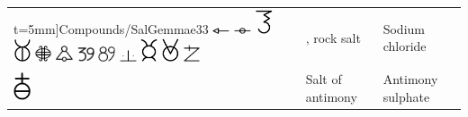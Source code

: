 \documentclass[british,final,landscape]{scrartcl}
\begin{document}
\begin{refsection}
\begin{supertabular}{p{0.3\textwidth}p{0.34\textwidth}p{0.34\textwidth}}
t=5mm]{Compounds/SalGemmae33} \includegraphics[width=5mm]{Compounds/SalGemmae34} \includegraphics[width=5mm]{Compounds/SalGemmae35} \includegraphics[width=5mm]{Compounds/SalGemmae36} \includegraphics[width=5mm]{Compounds/SalGemmae37} \includegraphics[width=5mm]{Compounds/SalGemmae38} \includegraphics[width=5mm]{Compounds/SalGemmae39} \includegraphics[width=5mm]{Compounds/SalGemmae40} \includegraphics[width=5mm]{Compounds/SalGemmae41} \includegraphics[width=5mm]{Compounds/SalGemmae42} \includegraphics[width=5mm]{Compounds/SalGemmae43} \includegraphics[width=5mm]{Compounds/SalGemmae44} \includegraphics[width=5mm]{Compounds/SalGemmae45} & , rock salt & Sodium chloride  \\
   \includegraphics[width=5mm]{Compounds/SaltOfAntimony} & Salt of antimony & Antimony sulphate  \\

\end{supertabular}
\end{refsection}
\end{document}
